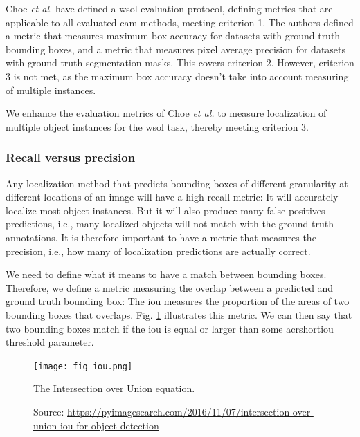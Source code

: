 Choe \textit{et al.} \cite{choe2020evaluating} have defined a \acrshort{wsol} evaluation protocol, defining metrics that are applicable to all evaluated \acrshort{cam} methods, meeting criterion 1. The authors defined a metric that measures maximum box accuracy for datasets with ground-truth bounding boxes, and a metric that measures pixel average precision for datasets with ground-truth segmentation masks. This covers criterion 2. However, criterion 3 is not met, as the maximum box accuracy doesn't take into account measuring of multiple instances.

We enhance the evaluation metrics of Choe \textit{et al.} to measure localization of multiple object instances for the \acrshort{wsol} task, thereby meeting criterion 3.

\subsubsection{Recall versus precision}
Any localization method that predicts bounding boxes of different granularity at different locations of an image will have a high recall metric: It will accurately localize most object instances. But it will also produce many false positives predictions, i.e., many localized objects will not match with the ground truth annotations. It is therefore important to have a metric that measures the precision, i.e., how many of localization predictions are actually correct.

We need to define what it means to have a match between bounding boxes. Therefore, we define a metric measuring the overlap between a predicted and ground truth bounding box: The \acrfull{iou} measures the proportion of the areas of two bounding boxes that overlaps. Fig. \ref{fig:iou} illustrates this metric.  We can then say that two bounding boxes match if the \acrshort{iou} is equal or larger than some acrshort{iou} threshold parameter.

\begin{figure}[ht]
    \begin{center}       
    \texttt{[image: fig\_iou.png]}
    \caption[The IoU equation]{The Intersection over Union equation.}
    \caption*{Source: \href{https://pyimagesearch.com/2016/11/07/intersection-over-union-iou-for-object-detection}{https://pyimagesearch.com/2016/11/07/intersection-over-union-iou-for-object-detection}}
    \label{fig:iou}
    \end{center}
\end{figure}


